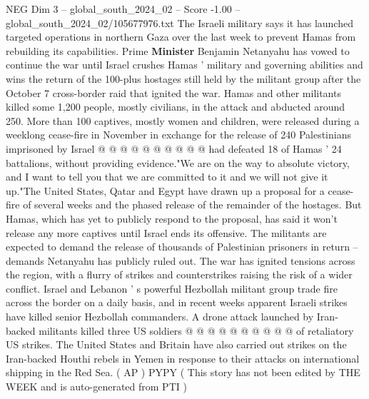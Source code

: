 \begin{textsample}{NEG Dim 3 – global\_south\_2024\_02 – Score -1.00 – global\_south\_2024\_02/105677976.txt}
The Israeli military says it has launched targeted operations in northern Gaza over the last week to prevent Hamas from rebuilding its capabilities.
Prime \textbf{Minister} Benjamin Netanyahu has vowed to continue the war until Israel crushes Hamas ' military and governing abilities and wins the return of the 100-plus hostages still held by the militant group after the October 7 cross-border raid that ignited the war.
Hamas and other militants killed some 1,200 people, mostly civilians, in the attack and abducted around 250.
More than 100 captives, mostly women and children, were released during a weeklong cease-fire in November in exchange for the release of 240 Palestinians imprisoned by Israel @ @ @ @ @ @ @ @ @ @ had defeated 18 of Hamas ' 24 battalions, without providing evidence."We are on the way to absolute victory, and I want to tell you that we are committed to it and we will not give it up."The United States, Qatar and Egypt have drawn up a proposal for a cease-fire of several weeks and the phased release of the remainder of the hostages.
But Hamas, which has yet to publicly respond to the proposal, has said it won't release any more captives until Israel ends its offensive.
The militants are expected to demand the release of thousands of Palestinian prisoners in return -- demands Netanyahu has publicly ruled out.
The war has ignited tensions across the region, with a flurry of strikes and counterstrikes raising the risk of a wider conflict.
Israel and Lebanon ' s powerful Hezbollah militant group trade fire across the border on a daily basis, and in recent weeks apparent Israeli strikes have killed senior Hezbollah commanders.
A drone attack launched by Iran-backed militants killed three US soldiers @ @ @ @ @ @ @ @ @ @ of retaliatory US strikes.
The United States and Britain have also carried out strikes on the Iran-backed Houthi rebels in Yemen in response to their attacks on international shipping in the Red Sea. ( AP ) PYPY ( This story has not been edited by THE WEEK and is auto-generated from PTI )

\end{textsample}
